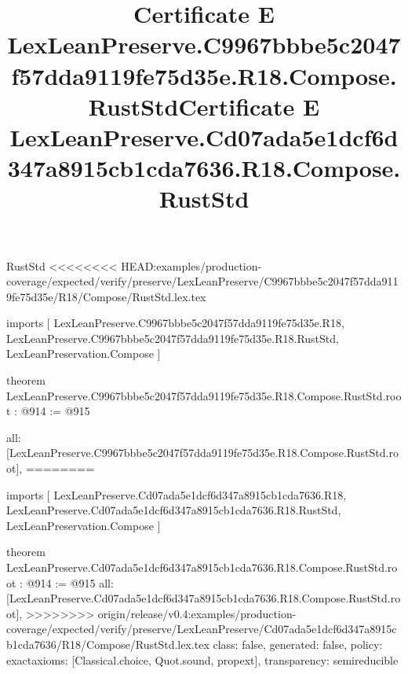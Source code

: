 \begin{lexlean}{RustStd}
<<<<<<<< HEAD:examples/production-coverage/expected/verify/preserve/LexLeanPreserve/C9967bbbe5c2047f57dda9119fe75d35e/R18/Compose/RustStd.lex.tex
\title{Certificate E LexLeanPreserve.C9967bbbe5c2047f57dda9119fe75d35e.R18.Compose.RustStd}
\begin{coremodule}
imports [
  LexLeanPreserve.C9967bbbe5c2047f57dda9119fe75d35e.R18,
  LexLeanPreserve.C9967bbbe5c2047f57dda9119fe75d35e.R18.RustStd,
  LexLeanPreservation.Compose
]

theorem LexLeanPreserve.C9967bbbe5c2047f57dda9119fe75d35e.R18.Compose.RustStd.root : @914 := @915 {
  all: [LexLeanPreserve.C9967bbbe5c2047f57dda9119fe75d35e.R18.Compose.RustStd.root],
========
\title{Certificate E LexLeanPreserve.Cd07ada5e1dcf6d347a8915cb1cda7636.R18.Compose.RustStd}
\begin{coremodule}
imports [
  LexLeanPreserve.Cd07ada5e1dcf6d347a8915cb1cda7636.R18,
  LexLeanPreserve.Cd07ada5e1dcf6d347a8915cb1cda7636.R18.RustStd,
  LexLeanPreservation.Compose
]

theorem LexLeanPreserve.Cd07ada5e1dcf6d347a8915cb1cda7636.R18.Compose.RustStd.root : @914 := @915 {
  all: [LexLeanPreserve.Cd07ada5e1dcf6d347a8915cb1cda7636.R18.Compose.RustStd.root],
>>>>>>>> origin/release/v0.4:examples/production-coverage/expected/verify/preserve/LexLeanPreserve/Cd07ada5e1dcf6d347a8915cb1cda7636/R18/Compose/RustStd.lex.tex
  class: false,
  generated: false,
  policy: exact{axioms: [Classical.choice, Quot.sound, propext]},
  transparency: semireducible
}


\end{coremodule}}
\end{coremodule}
\end{lexlean}
